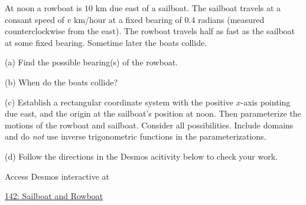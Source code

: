 \documentclass{ximera}
\begin{document}
\begin{question}  \label{Q343f44fd}
At noon a rowboat is $10$ km due east of a sailboat. The sailboat travels at a consant speed of $v$ km/hour at a fixed bearing of $0.4$ radians (measured counterclockwise from the east). The rowboat travels half as fast as the sailboat at some fixed bearing. Sometime later the boats collide.

(a) Find the possible bearing(s) of the rowboat.

(b) When do the boats collide?

(c) Establish a rectangular coordinate system with the positive $x$-axis pointing due east, and the origin at the sailboat's position at noon. Then parameterize the motions of the rowboat and sailboat. Consider all possibilities. Include domains and do \emph{not} use inverse trigonometric functions in the parameterizations.

(d) Follow the directions in the Desmos acitivity below to check your work.

 
\begin{onlineOnly}
    \begin{center}
\end{center}
\end{onlineOnly}

Access Desmos interactive at

\href{https://www.desmos.com/calculator/xjiwflhe2o}{142: Sailboat and Rowboat}

\end{question}
\end{document}
